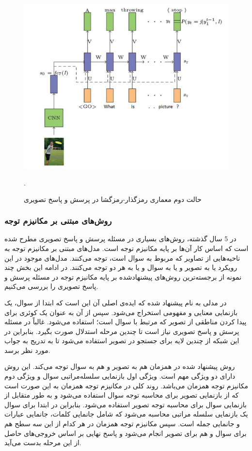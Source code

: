 \begin{figure}
	\centerline{\includegraphics[scale=0.4]{images/encoder-decoder2.JPG}}
	\caption{حالت دوم معماری رمزگذار-رمزگشا در پرسش و پاسخ تصویری}.
	\label{fig:encoderdecoder2}
\end{figure}

\subsubsection{ روش‌های مبتنی بر مکانیزم توجه}
در 5 سال گذشته، روش‌های بسیاری در مسئله پرسش و پاسخ تصویری مطرح شده است که اساس کار آن‌ها بر پایه مکانیزم توجه
 است. مدل‌های مبتنی بر مکانیزم توجه به ناحیه‌هایی از تصاویر که مربوط به سوال است، توجه می‌کنند. مدل‌های موجود در این رویکرد یا به تصویر و یا به سوال و یا به هر دو توجه می‌کنند. در ادامه این بخش چند نمونه از برجسته‌ترین روش‌های پیشنهادشده بر پایه مکانیزم توجه در مسئله پرسش و پاسخ تصویری را بررسی می‌کنیم.

در 
\cite{yang2016stacked}
مدلی به نام 
پیشنهاد شده که ایده‌ی اصلی آن این است که ابتدا از سوال، یک  بازنمایی معنایی و مفهومی استخراج می‌شود. سپس از آن به عنوان یک کوئری برای پیدا کردن مناطقی از تصویر که مرتبط با سوال است؛ استفاده می‌شود. غالباً در مسئله پرسش و پاسخ تصویری نیاز است تا چندین مرحله استدلال صورت بگیرد. بنابراین در این شبکه از چندین لایه برای جستجو در تصویر استفاده می‌شود تا به تدریج به جواب مورد نظر برسد.

روش پیشنهاد شده در 
\cite{lu2016hierarchical}
همزمان هم به تصویر و هم به سوال توجه می‌کند. این روش دارای دو ویژگی مهم است. ویژگی اول بازنمایی سلسله‌مراتبی سوال و ویژگی دوم مکانیزم توجه همزمان
 می‌باشد. روند کلی در مکانیزم توجه همزمان به این صورت است که از بازنمایی تصویر برای محاسبه توجه سوال استفاده می‌شود و به طور متقابل از بازنمایی سوال برای محاسبه توجه تصویر استفاده می‌شود. بنابراین در
\cite{lu2016hierarchical}
 ابتدا برای سوال یک بازنمایی سلسله مراتبی محاسبه می‌شود که شامل جانمایی کلمات، جانمایی عبارات و جانمایی جمله است. سپس مکانیزم توجه همزمان در هر کدام از این سه سطح هم برای سوال و هم برای تصویر انجام می‌شود و پاسخ نهایی بر اساس خروجی‌های حاصل از این مرحله بدست می‌آید.
 
